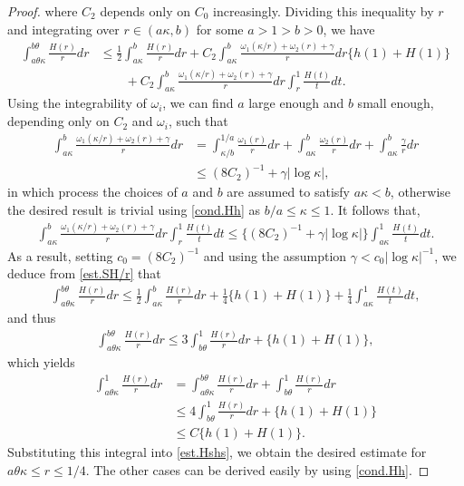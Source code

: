 \documentclass[reqno,12pt]{amsart} %
\theoremstyle{definition}
\theoremstyle{remark}
\numberwithin{equation}{section}
\begin{document}
\begin{proof}
where $C_2$ depends only on $C_0$ increasingly. Dividing this inequality by $r$ and integrating over $r\in(a \kappa, b)$ for some $a>1>b>0$, we have
\begin{align}
  \int_{a \theta \kappa}^{b\theta}\frac{H(r)}{r}dr&\leq \frac{1}{2}\int_{a\kappa}^{b}\frac{H(r)}{r}dr+C_2\int_{a\kappa}^{b}\frac{\omega_1(\kappa/r)+\omega_2(r)+\gamma}{r}dr \{h(1)+H(1)\}\nonumber\\&\qquad+C_2\int_{a\kappa}^{b}\frac{\omega_1(\kappa/r)+\omega_2(r)+\gamma}{r}dr\int_r^1\frac{H(t)}{t}dt. \label{est.SH/r}
\end{align}
Using the integrability of $\omega_i$, we can find $a$ large enough and $b$ small enough, depending only on $C_2$ and $\omega_i$, such that
\begin{align*}
\int_{a\kappa}^{b}\frac{\omega_1(\kappa/r)+\omega_2(r)+\gamma}{r}dr&=\int_{\kappa/b}^{1/a}\frac{\omega_1(r)}{r}dr+\int_{a \kappa}^b\frac{\omega_2(r)}{r}dr+\int_{a \kappa}^b\frac{\gamma}{r}dr\\&\leq (8C_2)^{-1}+\gamma|\log\kappa|,
\end{align*}
in which process the choices of $a$ and $b$ are assumed to satisfy $a\kappa<b$, otherwise the desired result is trivial using \eqref{cond.Hh} as $b/a\leq \kappa\leq 1$. It follows that, 
\begin{align*}
\int_{a\kappa}^{b}\frac{\omega_1(\kappa/r)+\omega_2(r)+\gamma}{r}dr\int_r^1\frac{H(t)}{t}dt
\leq \{(8C_2)^{-1}+\gamma|\log\kappa|\}\int_{a\kappa}^1\frac{H(t)}{t}dt. 
\end{align*}
As a result, setting $c_0=(8C_2)^{-1}$ and using the assumption $\gamma<c_0|\log\kappa|^{-1}$, we deduce from \eqref{est.SH/r} that
\begin{align*}
  \int_{a \theta \kappa}^{b\theta}\frac{H(r)}{r}dr \leq \frac{1}{2}\int_{a\kappa}^{b}\frac{H(r)}{r}dr+\frac{1}{4}\{h(1)+H(1)\}+\frac{1}{4}\int_{a\kappa}^1\frac{H(t)}{t}dt,
\end{align*}
and thus
\begin{align*}
    \int_{a \theta \kappa}^{b\theta}\frac{H(r)}{r}dr \leq 3\int_{b\theta}^{1}\frac{H(r)}{r}dr+\{h(1)+H(1)\},
\end{align*}
which yields
\begin{align*}
  \int_{a \theta \kappa}^{1}\frac{H(r)}{r}dr & = \int_{a \theta \kappa}^{b\theta}\frac{H(r)}{r}dr+\int_{b\theta}^{1}\frac{H(r)}{r}dr\\
  & \leq 4\int_{b\theta}^{1}\frac{H(r)}{r}dr+\{h(1)+H(1)\}\\
  & \leq C\{h(1)+H(1)\}. 
\end{align*}
Substituting this integral into \eqref{est.Hshs}, we obtain the desired estimate for $a\theta \kappa\leq r\leq 1/4$. The other cases can be derived easily by using \eqref{cond.Hh}. 
\end{proof}
\end{document}
